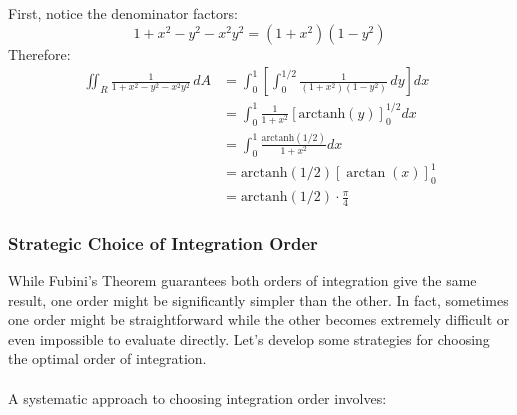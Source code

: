\begin{example}
\begin{solution}
\begin{enumerate}
First, notice the denominator factors:
\[
1 + x^2 - y^2 - x^2y^2 = (1 + x^2)(1 - y^2)
\]
Therefore:
\begin{align*}
\iint_R \frac{1}{1 + x^2 - y^2 - x^2y^2} \,dA &= \int_0^1 \left[\int_0^{1/2} \frac{1}{(1+x^2)(1-y^2)} \,dy\right] dx \\
&= \int_0^1 \frac{1}{1+x^2}\left[\text{arctanh}(y)\right]_0^{1/2} dx \\
&= \int_0^1 \frac{\text{arctanh}(1/2)}{1+x^2} dx \\
&= \text{arctanh}(1/2)\left[\arctan(x)\right]_0^1 \\
&= \text{arctanh}(1/2)\cdot\frac{\pi}{4}
\end{align*}
\end{enumerate}
\end{solution}
\end{example}
\exampleline

\subsubsection*{Strategic Choice of Integration Order}

\noindent While Fubini's Theorem guarantees both orders of integration give the same result, one order might be significantly simpler than the other. In fact, sometimes one order might be straightforward while the other becomes extremely difficult or even impossible to evaluate directly. Let's develop some strategies for choosing the optimal order of integration. \\ \\ A systematic approach to choosing integration order involves:

